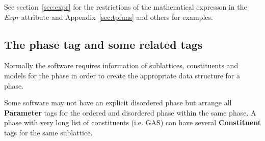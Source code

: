 \documentclass{article}
\begin{document}
See section~\ref{sec:expr} for the restrictions of the mathenatical
expresson in the {\em Expr} attribute and Appendix~\ref{sec:tpfuns}
and others for examples.

\newpage 

\subsection{The phase tag and some related tags}\label{sec:phase}

Normally the software requires information of sublattices,
constituents and models for the phase in order to create the
appropriate data structure for a phase.

Some software may not have an explicit disordered phase but arrange
all {\bf Parameter} tags for the ordered and disordered phase within
the same phase.  A phase with very long list of constituents
(i.e. GAS) can have several {\bf Constituent} tags for the same
sublattice.
\end{document}
